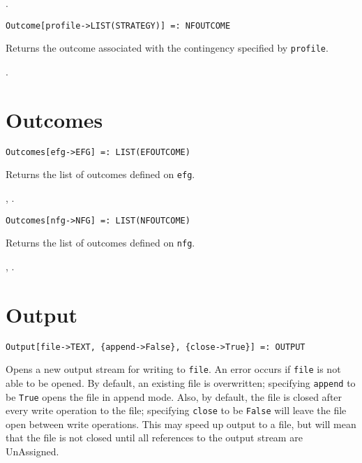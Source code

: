 \seealso {}.

\newsignature

\begin{verbatim}
Outcome[profile->LIST(STRATEGY)] =: NFOUTCOME 
\end{verbatim}

\noindent Returns the outcome associated with the contingency specified by
\verb+profile+.

\seealso {}.


\section*{Outcomes}\label{PrimOutcomes}
\begin{verbatim}
Outcomes[efg->EFG] =: LIST(EFOUTCOME) 
\end{verbatim}

\noindent
Returns the list of outcomes defined on \verb+efg+.

\seealso {},
.

\newsignature

\begin{verbatim}
Outcomes[nfg->NFG] =: LIST(NFOUTCOME) 
\end{verbatim}

\noindent
Returns the list of outcomes defined on \verb+nfg+.

\seealso {},
.


\section*{Output}\label{PrimOutput}
\begin{verbatim}
Output[file->TEXT, {append->False}, {close->True}] =: OUTPUT 
\end{verbatim}

\noindent
Opens a new output stream for writing to \verb+file+.  An error occurs
if \verb+file+ is not able to be opened.  By default, an existing file
is overwritten; specifying \verb+append+ to be \verb+True+ opens the
file in append mode.  Also, by default, the file is closed after every
write operation to the file; specifying \verb+close+ to be
\verb+False+ will leave the file open between write operations.  This
may speed up output to a file, but will mean that the file is not
closed until all references to the output stream are UnAssigned.


